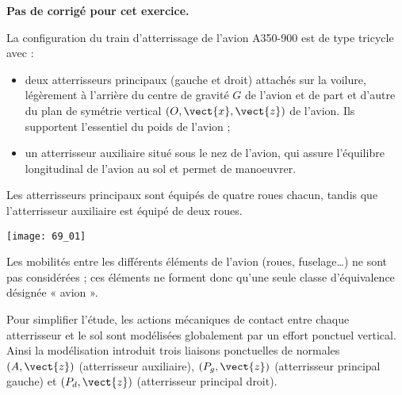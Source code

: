 \normaltrue \difficilefalse \tdifficilefalse
\correctionfalse

\exer{ $\star$ \label{B2:16:69}}
\setcounter{numques}{0}


\ifcorrection
\else
\textbf{Pas de corrigé pour cet exercice.}
\fi

\ifprof
\else
La configuration du train d’atterrissage de l’avion A350-900 est de type tricycle avec :
\begin{itemize}
\item deux atterrisseurs principaux (gauche et droit) attachés sur la voilure, légèrement à
l’arrière du centre de gravité $G$ de l’avion et de part et d’autre du plan de symétrie
vertical $\left(O, \vect{x}, \vect{z}\right)$ de l'avion. Ils supportent l’essentiel du poids de l’avion ;
\item un atterrisseur auxiliaire situé sous le nez de l’avion, qui assure l’équilibre longitudinal
de l’avion au sol et permet de manoeuvrer.
\end{itemize}
Les atterrisseurs principaux sont équipés de quatre roues chacun, tandis que
l’atterrisseur auxiliaire est équipé de deux roues.



\begin{center}
\texttt{[image: 69\_01]}
\end{center}

Les mobilités entre les différents éléments de l’avion (roues,
fuselage…) ne sont pas considérées ; ces éléments ne forment donc qu’une seule
classe d’équivalence désignée « avion ».

\fi

\ifprof
\else 
\fi

\ifprof
\else 
\fi

Pour simplifier l’étude, les actions mécaniques de contact entre chaque atterrisseur et
le sol sont modélisées globalement par un effort ponctuel vertical. Ainsi la modélisation
introduit trois liaisons ponctuelles de normales $(A, \vect{z})$ (atterrisseur
auxiliaire), $(P_g, \vect{z})$ (atterrisseur principal gauche) et $(P_d, \vect{z})$ (atterrisseur principal droit).

